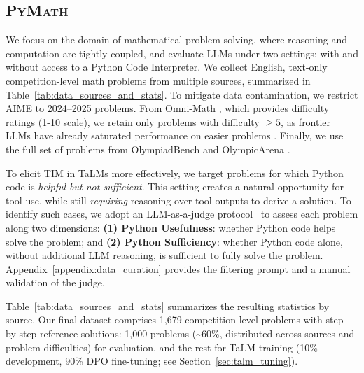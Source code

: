 \documentclass[11pt]{article}
\def \dataset{\textsc{PyMath}\xspace}
\def \task{\textsc{TIM}\xspace}
\newcommand{\pouya}[1]{{\color{violet}Pouya: #1}}
\begin{document}
\subsection{\dataset{}}
\label{sec:data_curation}
We focus on the domain of mathematical problem solving, where reasoning and computation are tightly coupled, and evaluate LLMs under two settings: with and without access to a Python Code Interpreter. We collect English, text-only competition-level math problems from multiple sources, summarized in Table~\ref{tab:data_sources_and_stats}. To mitigate data contamination, we restrict AIME \citep{AIME20242025} to 2024–2025 problems. From Omni-Math \citep{gao2024omnimathuniversalolympiadlevel}, which provides difficulty ratings (1-10 scale), we retain only problems with difficulty $\geq5$, as frontier LLMs have already saturated performance on easier problems \citep{gpt5, claudeopus4andsonnet4}. Finally, we use the full set of problems from OlympiadBench \citep{he-etal-2024-olympiadbench} and OlympicArena \citep{huang2024olympicarena}.

To elicit \task{} in TaLMs more effectively, we target problems for which Python code is \textit{helpful but not sufficient}. This setting creates a natural opportunity for tool use, while still \emph{requiring} reasoning over tool outputs to derive a solution. To identify such cases, we adopt an LLM-as-a-judge protocol~\citep{gu2025surveyllmasajudge} to assess each problem along two dimensions: \textbf{(1) Python Usefulness}: whether Python code helps solve the problem; and \textbf{(2) Python Sufficiency}: whether Python code alone, without additional LLM reasoning, is sufficient to fully solve the problem. Appendix~\ref{appendix:data_curation} provides the filtering prompt and a manual validation of the judge.

Table~\ref{tab:data_sources_and_stats} summarizes the resulting statistics by source. Our final dataset comprises 1,679 competition-level problems with step-by-step reference solutions: 1,000 problems (\textasciitilde{}60\%, distributed across sources and problem difficulties) for evaluation, and the rest for TaLM training (10\% development, 90\% DPO fine-tuning; see Section~\ref{sec:talm_tuning}).

\end{document}
